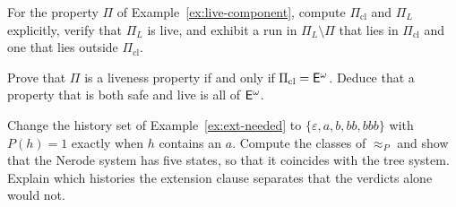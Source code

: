 \begin{exercise}
For the property $\Pi$ of Example~\ref{ex:live-component}, compute $\Pi_{\mathrm{cl}}$ and $\Pi_L$ explicitly, verify that $\Pi_L$ is live, and exhibit a run in $\Pi_L\setminus\Pi$ that lies in $\Pi_{\mathrm{cl}}$ and one that lies outside $\Pi_{\mathrm{cl}}$.
\end{exercise}

\begin{exercise}
Prove that $\Pi$ is a liveness property if and only if $\Pi_{\mathrm{cl}}=\mathsf{E}^{\omega}$. Deduce that a property that is both safe and live is all of $\mathsf{E}^{\omega}$.\label{ex:live-closure}
\end{exercise}

\begin{exercise}
Change the history set of Example~\ref{ex:ext-needed} to $\{\varepsilon,a,b,bb,bbb\}$ with $P(h)=1$ exactly when $h$ contains an $a$. Compute the classes of $\approx_P$ and show that the Nerode system has five states, so that it coincides with the tree system. Explain which histories the extension clause separates that the verdicts alone would not.
\end{exercise}


